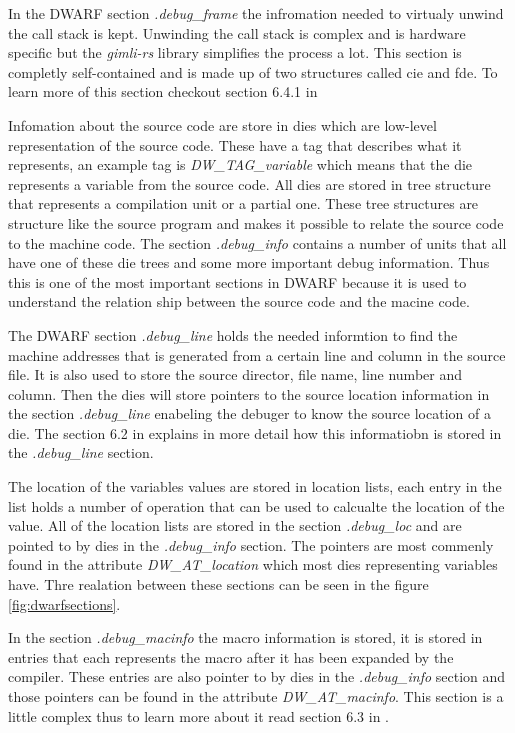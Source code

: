 In the \gls{DWARF} section \emph{.debug\_frame} the infromation needed to virtualy unwind the call stack is kept.
Unwinding the call stack is complex and is hardware specific but the \emph{gimli-rs} library simplifies the process a lot.
This section is completly self-contained and is made up of two structures called \acrfull{cie} and \acrfull{fde}.
To learn more of this section checkout section 6.4.1 in \cite{dwarf}


Infomation about the source code are store in \glspl{die} which are low-level representation of the source code.
These have a tag that describes what it represents, an example tag is \emph{DW\_TAG\_variable} which means that the \gls{die} represents a variable from the source code.
All \glspl{die} are stored in \gls{tree} structure that represents a compilation unit or a partial one.
These \gls{tree} structures are structure like the source program and makes it possible to relate the source code to the machine code.
The section \emph{.debug\_info} contains a number of units that all have one of these \gls{die} \glspl{tree} and some more important debug information.
Thus this is one of the most important sections in \gls{DWARF} because it is used to understand the relation ship between the source code and the macine code.


The \gls{DWARF} section \emph{.debug\_line} holds the needed informtion to find the machine addresses that is generated from a certain line and column in the source file.
It is also used to store the source director, file name, line number and column.
Then the \glspl{die} will store pointers to the source location information in the section \emph{.debug\_line} enabeling the debuger to know the source location of a \gls{die}.
The section 6.2 in \cite{dwarf} explains in more detail how this informatiobn is stored in the \emph{.debug\_line} section.


The location of the variables values are stored in location lists, each entry in the list holds a number of operation that can be used to calcualte the location of the value.
All of the location lists are stored in the section \emph{.debug\_loc} and are pointed to by \glspl{die} in the \emph{.debug\_info} section.
The pointers are most commenly found in the attribute \emph{DW\_AT\_location} which most dies representing variables have.
Thre realation between these sections can be seen in the figure \ref{fig:dwarfsections}.


In the section \emph{.debug\_macinfo} the macro information is stored, it is stored in entries that each represents the macro after it has been expanded by the compiler.
These entries are also pointer to by \glspl{die} in the \emph{.debug\_info} section and those pointers can be found in the attribute \emph{DW\_AT\_macinfo}.
This section is a little complex thus to learn more about it read section 6.3 in \cite{dwarf}.


